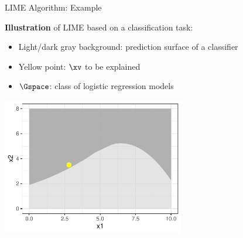 \documentclass[11pt,compress,t,notes=noshow, aspectratio=169, xcolor=table]{beamer}
\begin{document}
\begin{frame}{LIME Algorithm: Example}

    	\textbf{Illustration} of LIME based on a classification task:
		\begin{itemize}
			\item Light/dark gray background: prediction surface of a classifier
			\item Yellow point: $\xv$ to be explained
			\item $\Gspace$: class of logistic regression models 
		\end{itemize}
		\begin{center}
			\includegraphics[width=0.6\textwidth]{figure/lime2}
		\end{center}

\end{frame} 
\end{document}
